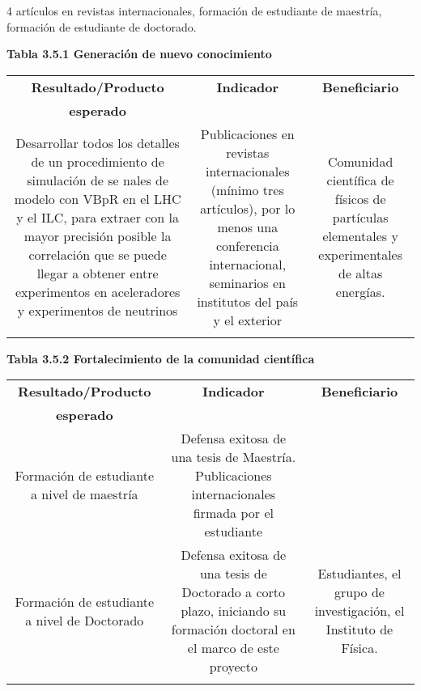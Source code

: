 4 artículos en revistas internacionales, formación de estudiante de
maestría, formación de estudiante de doctorado.

\textbf{Tabla 3.5.1 Generación de nuevo conocimiento}\\
\begin{tabular}{|c|c|c|}\hline
   \textbf{Resultado/Producto}&\textbf{Indicador} & \textbf{Beneficiario}\\
   \textbf{esperado}& & \\\hline
   \parbox[t]{4cm}{Desarrollar todos los detalles de un procedimiento de simulación de se nales de modelo con VBpR en el LHC y el ILC, para extraer con la mayor precisión posible la correlación que se puede llegar a obtener entre experimentos en aceleradores y experimentos de neutrinos}& \parbox[t]{4cm}{Publicaciones en revistas internacionales (mínimo tres artículos), por lo menos una conferencia internacional, seminarios en institutos del país y el exterior}& \parbox[t]{4cm}{Comunidad científica de físicos de partículas elementales y experimentales de altas energías.}\\\hline 
   & & \\\hline
 \end{tabular}

\textbf{Tabla 3.5.2 Fortalecimiento de la comunidad científica}\\
\begin{tabular}{|c|c|c|}\hline
   \textbf{Resultado/Producto}&\textbf{Indicador} & \textbf{Beneficiario}\\
   \textbf{esperado}& & \\\hline
 \parbox[t]{4cm}{Formación de estudiante a nivel de maestría} &\parbox[t]{4cm}{Defensa exitosa de una tesis de Maestría. Publicaciones internacionales firmada por el estudiante} & \\\hline 
\parbox[t]{4cm}{Formación de estudiante a nivel de Doctorado}  & \parbox[t]{4cm}{Defensa exitosa de una tesis de Doctorado a corto plazo, iniciando su formación doctoral en el marco de este proyecto}& \parbox[t]{4cm}{Estudiantes, el grupo de investigación, el Instituto de Física.} \\\hline
\parbox[t]{4cm}{}  & \parbox[t]{4cm}{}& \parbox[t]{4cm}{} \\\hline
 \end{tabular}

